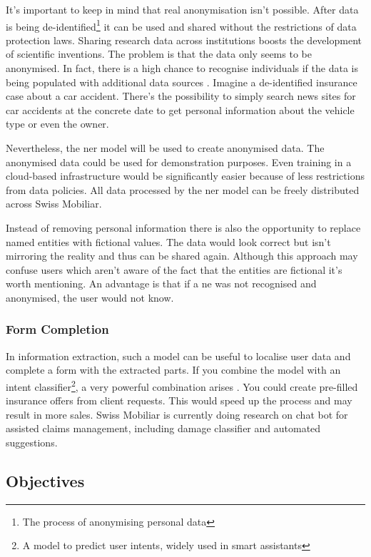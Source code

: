 It's important to keep in mind that real anonymisation isn't possible. After data is being de-identified\footnote{The process
of anonymising personal data} it can be used and shared without the restrictions of data protection laws. Sharing research data
across institutions boosts the development of scientific inventions. The problem is that the data only seems to be anonymised. In
fact, there is a high chance to recognise individuals if the data is being populated with additional data sources \cite{rocher19}.
Imagine a de-identified insurance case about a car accident. There's the possibility to simply search news sites for car accidents at the concrete date to get personal information about the vehicle type or even the owner.

Nevertheless, the \acrshort{ner} model will be used to create anonymised data. The anonymised data could be used for demonstration
purposes. Even training in a cloud-based infrastructure would be significantly easier because of less restrictions from data policies. All data processed by the \acrshort{ner} model can be freely distributed across Swiss Mobiliar.

Instead of removing personal information there is also the opportunity to replace named entities with fictional values. The data
would look correct but isn't mirroring the reality and thus can be shared again. Although this approach may confuse users which
aren't aware of the fact that the entities are fictional it's worth mentioning. An advantage is that if a \acrshort{ne} was not
recognised and anonymised, the user would not know.

\subsubsection{Form Completion}

In information extraction, such a model can be useful to localise user data and complete a form with the extracted parts. If
you combine the model with an intent classifier\footnote{A model to predict user intents, widely used in smart assistants},
a very powerful combination arises \cite{jain18}. You could create pre-filled insurance offers from client requests. This would
speed up the process and may result in more sales. Swiss Mobiliar is currently doing research on chat bot for assisted claims
management, including damage classifier and automated suggestions.

\subsection{Objectives}

